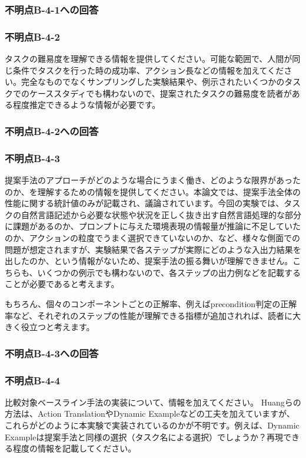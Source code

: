 \documentclass{jsarticle}
\begin{document}
\subsubsection*{不明点B-4-1への回答}

\subsubsection*{不明点B-4-2}
\begin{screen}
タスクの難易度を理解できる情報を提供してください。可能な範囲で、人間が同じ条件でタスクを行った時の成功率、アクション長などの情報を加えてください。完全なものでなくサンプリングした実験結果や、例示されたいくつかのタスクでのケーススタディでも構わないので、提案されたタスクの難易度を読者がある程度推定できるような情報が必要です。
\end{screen}
\subsubsection*{不明点B-4-2への回答}

\subsubsection*{不明点B-4-3}
\begin{screen}
提案手法のアプローチがどのような場合にうまく働き、どのような限界があったのか、を理解するための情報を提供してください。本論文では、提案手法全体の性能に関する統計値のみが記載され、議論されています。今回の実験では、タスクの自然言語記述から必要な状態や状況を正しく抜き出す自然言語処理的な部分に課題があるのか、プロンプトに与えた環境表現の情報量が推論に不足していたのか、アクションの粒度でうまく選択できていないのか、など、様々な側面での問題が想定されますが、実験結果で各ステップが実際にどのような入出力結果を出したのか、という情報がないため、提案手法の振る舞いが理解できません。こちらも、いくつかの例示でも構わないので、各ステップの出力例などを記載することが必要であると考えます。

もちろん、個々のコンポーネントごとの正解率、例えばprecondition判定の正解率など、それぞれのステップの性能が理解できる指標が追加されれば、読者に大きく役立つと考えます。
\end{screen}

\subsubsection*{不明点B-4-3への回答}

\subsubsection*{不明点B-4-4}
\begin{screen}
比較対象ベースライン手法の実装について、情報を加えてください。
Huangらの方法は、Action TranslationやDynamic Exampleなどの工夫を加えていますが、これらがどのように本実験で実装されているのかが不明です。例えば、Dynamic Exampleは提案手法と同様の選択（タスク名による選択）でしょうか？再現できる程度の情報を記載してください。
\end{screen}
\end{document}

